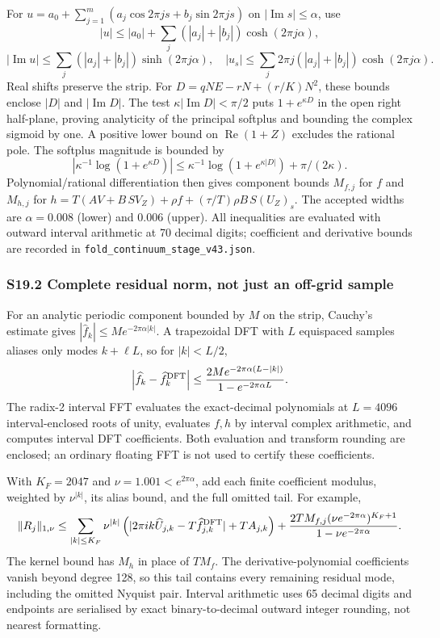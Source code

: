 \documentclass[
  10pt,
  a4paper,
]{article}
\begin{document}
For \(u=a_0+\sum_{j=1}^m(a_j\cos2\pi js+b_j\sin2\pi js)\) on
\(|\operatorname{Im}s|\le\alpha\), use
\[|u|\le|a_0|+\sum_j(|a_j|+|b_j|)\cosh(2\pi j\alpha),\]
\[|\operatorname{Im}u|\le\sum_j(|a_j|+|b_j|)\sinh(2\pi j\alpha),\quad |u_s|\le\sum_j2\pi j(|a_j|+|b_j|)\cosh(2\pi j\alpha).\]
Real shifts preserve the strip. For \(D=qNE-rN+(r/K)N^2\), these bounds
enclose \(|D|\) and \(|\operatorname{Im}D|\). The test
\(\kappa|\operatorname{Im}D|<\pi/2\) puts \(1+e^{\kappa D}\) in the open
right half-plane, proving analyticity of the principal softplus and
bounding the complex sigmoid by one. A positive lower bound on
\(\operatorname{Re}(1+Z)\) excludes the rational pole. The softplus
magnitude is bounded by
\[|\kappa^{-1}\log(1+e^{\kappa D})|\le\kappa^{-1}\log(1+e^{\kappa|D|})+\pi/(2\kappa).\]
Polynomial/rational differentiation then gives component bounds
\(M_{f,j}\) for \(f\) and \(M_{h,j}\) for
\(h=T(AV+B\,SV_Z)+\rho f+(\tau/T)\rho B\,S(U_Z)_s\). The accepted widths
are \(\alpha=0.008\) (lower) and \(0.006\) (upper). All inequalities are
evaluated with outward interval arithmetic at 70 decimal digits;
coefficient and derivative bounds are recorded in
\texttt{fold\_continuum\_stage\_v43.json}.

\subsubsection{S19.2 Complete residual norm, not just an off-grid
sample}\label{s19.2-complete-residual-norm-not-just-an-off-grid-sample}

For an analytic periodic component bounded by \(M\) on the strip,
Cauchy's estimate gives \(|\widehat f_k|\le M e^{-2\pi\alpha|k|}\). A
trapezoidal DFT with \(L\) equispaced samples aliases only modes
\(k+\ell L\), so for \(|k|<L/2\),
\[\left|\widehat f_k-\widehat f^{\rm DFT}_k\right|\le\frac{2M e^{-2\pi\alpha(L-|k|)}}{1-e^{-2\pi\alpha L}}.\]
The radix-2 interval FFT evaluates the exact-decimal polynomials at
\(L=4096\) interval-enclosed roots of unity, evaluates \(f,h\) by
interval complex arithmetic, and computes interval DFT coefficients.
Both evaluation and transform rounding are enclosed; an ordinary
floating FFT is not used to certify these coefficients.

With \(K_F=2047\) and \(\nu=1.001<e^{2\pi\alpha}\), add each finite
coefficient modulus, weighted by \(\nu^{|k|}\), its alias bound, and the
full omitted tail. For example,
\[\|R_j\|_{1,\nu}\le\sum_{|k|\le K_F}\nu^{|k|}\left(|2\pi i k\widehat U_{j,k}-T\widehat f^{\rm DFT}_{j,k}|+T A_{j,k}\right)+\frac{2TM_{f,j}(\nu e^{-2\pi\alpha})^{K_F+1}}{1-\nu e^{-2\pi\alpha}}.\]
The kernel bound has \(M_h\) in place of \(TM_f\). The
derivative-polynomial coefficients vanish beyond degree 128, so this
tail contains every remaining residual mode, including the omitted
Nyquist pair. Interval arithmetic uses 65 decimal digits and endpoints
are serialised by exact binary-to-decimal outward integer rounding, not
nearest formatting.
\end{document}
